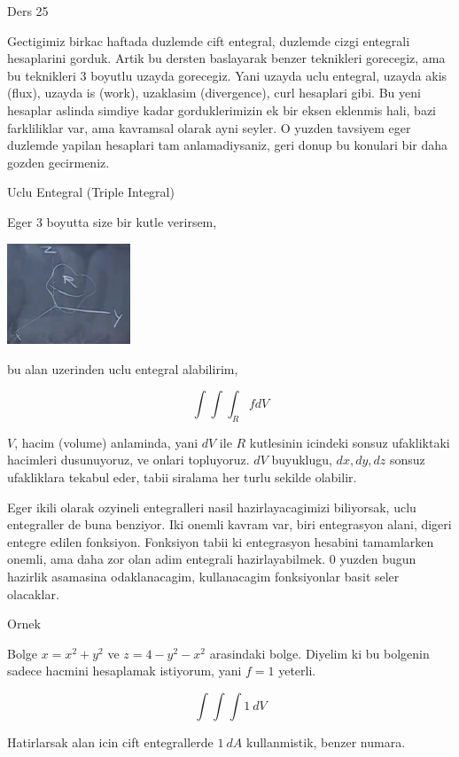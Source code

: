 \documentclass[12pt,fleqn]{article}\usepackage{../common}
\begin{document}
Ders 25

Gectigimiz birkac haftada duzlemde cift entegral, duzlemde cizgi entegrali
hesaplarini gorduk. Artik bu dersten baslayarak benzer teknikleri
gorecegiz, ama bu teknikleri 3 boyutlu uzayda gorecegiz. Yani uzayda uclu
entegral, uzayda akis (flux), uzayda is (work), uzaklasim (divergence),
curl hesaplari gibi. Bu yeni hesaplar aslinda simdiye kadar gorduklerimizin
ek bir eksen eklenmis hali, bazi farkliliklar var, ama kavramsal olarak
ayni seyler. O yuzden tavsiyem eger duzlemde yapilan hesaplari tam
anlamadiysaniz, geri donup bu konulari bir daha gozden gecirmeniz. 

Uclu Entegral (Triple Integral)

Eger 3 boyutta size bir kutle verirsem, 

\includegraphics[height=3cm]{25_1.png}

bu alan uzerinden uclu entegral alabilirim, 

\[ \int \int \int _R f dV \]

$V$, hacim (volume) anlaminda, yani $dV$ ile $R$ kutlesinin icindeki sonsuz
ufakliktaki hacimleri dusunuyoruz, ve onlari topluyoruz. $dV$ buyuklugu,
$dx,dy,dz$ sonsuz ufakliklara tekabul eder, tabii siralama her turlu
sekilde olabilir.

Eger ikili olarak ozyineli entegralleri nasil hazirlayacagimizi biliyorsak,
uclu entegraller de buna benziyor. Iki onemli kavram var, biri entegrasyon
alani, digeri entegre edilen fonksiyon. Fonksiyon tabii ki entegrasyon
hesabini tamamlarken onemli, ama daha zor olan adim entegrali
hazirlayabilmek. 0 yuzden bugun hazirlik asamasina odaklanacagim,
kullanacagim fonksiyonlar basit seler olacaklar. 

Ornek 

Bolge $x = x^2 + y^2$ ve $z = 4 - y^2 - x^2$ arasindaki bolge. Diyelim ki
bu bolgenin sadece hacmini hesaplamak istiyorum, yani $f = 1$ yeterli. 

\[ \int \int \int 1 \ dV \]

Hatirlarsak alan icin cift entegrallerde $1 \ dA$ kullanmistik, benzer
numara. 
\end{document}
